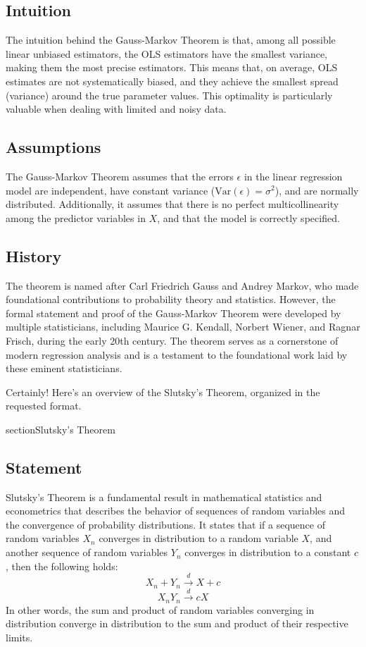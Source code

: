 \documentclass{article}
\begin{document}
\subsection{Intuition}
The intuition behind the Gauss-Markov Theorem is that, among all possible linear unbiased estimators, the OLS estimators have the smallest variance, making them the most precise estimators. This means that, on average, OLS estimates are not systematically biased, and they achieve the smallest spread (variance) around the true parameter values. This optimality is particularly valuable when dealing with limited and noisy data.

\subsection{Assumptions}
The Gauss-Markov Theorem assumes that the errors \(\epsilon\) in the linear regression model are independent, have constant variance (\(\text{Var}(\epsilon) = \sigma^2\)), and are normally distributed. Additionally, it assumes that there is no perfect multicollinearity among the predictor variables in \(X\), and that the model is correctly specified.

\subsection{History}
The theorem is named after Carl Friedrich Gauss and Andrey Markov, who made foundational contributions to probability theory and statistics. However, the formal statement and proof of the Gauss-Markov Theorem were developed by multiple statisticians, including Maurice G. Kendall, Norbert Wiener, and Ragnar Frisch, during the early 20th century. The theorem serves as a cornerstone of modern regression analysis and is a testament to the foundational work laid by these eminent statisticians.

Certainly! Here's an overview of the Slutsky's Theorem, organized in the requested format.

section{Slutsky's Theorem}

\subsection{Statement}
Slutsky's Theorem is a fundamental result in mathematical statistics and econometrics that describes the behavior of sequences of random variables and the convergence of probability distributions. It states that if a sequence of random variables \(X_n\) converges in distribution to a random variable \(X\), and another sequence of random variables \(Y_n\) converges in distribution to a constant \(c\), then the following holds:
\[ X_n + Y_n \xrightarrow{d} X + c \]
\[ X_nY_n \xrightarrow{d} cX \]
In other words, the sum and product of random variables converging in distribution converge in distribution to the sum and product of their respective limits.
\end{document}
